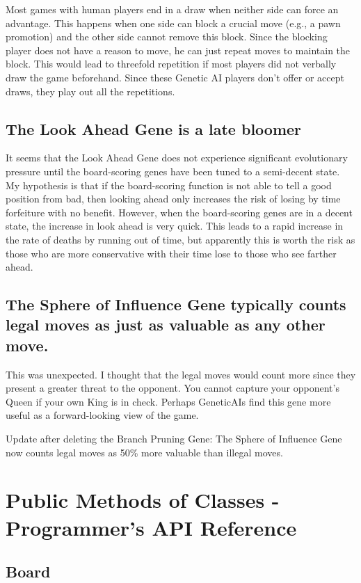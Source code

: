 \documentclass[letter]{article}
\renewcommand\_{\textunderscore\allowbreak}
\begin{document}
Most games with human players end in a draw when neither side can force an advantage. This happens when one side can block a crucial move (e.g., a pawn promotion) and the other side cannot remove this block. Since the blocking player does not have a reason to move, he can just repeat moves to maintain the block. This would lead to threefold repetition if most players did not verbally draw the game beforehand. Since these Genetic AI players don't offer or accept draws, they play out all the repetitions.

\subsection*{The Look Ahead Gene is a late bloomer}

It seems that the Look Ahead Gene does not experience significant evolutionary pressure until the board-scoring genes have been tuned to a semi-decent state. My hypothesis is that if the board-scoring function is not able to tell a good position from bad, then looking ahead only increases the risk of losing by time forfeiture with no benefit. However, when the board-scoring genes are in a decent state, the increase in look ahead is very quick. This leads to a rapid increase in the rate of deaths by running out of time, but apparently this is worth the risk as those who are more conservative with their time lose to those who see farther ahead.

\subsection*{The Sphere of Influence Gene typically counts legal moves as just as valuable as any other move.}

This was unexpected. I thought that the legal moves would count more since they present a greater threat to the opponent. You cannot capture your opponent's Queen if your own King is in check. Perhaps Genetic\_AIs find this gene more useful as a forward-looking view of the game.

Update after deleting the Branch Pruning Gene: The Sphere of Influence Gene now counts legal moves as 50\% more valuable than illegal moves.


\section{Public Methods of Classes - Programmer's API Reference}

\subsection{Board}
\end{document}
